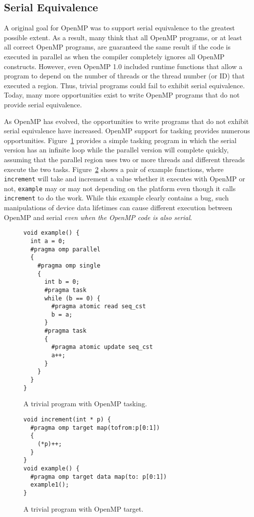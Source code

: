 \subsection{Serial Equivalence}
\label{sub:serial_equivalence}

A original goal for OpenMP was to support serial equivalence to the 
greatest possible extent. As a result, many think that all OpenMP programs, 
or at least all correct OpenMP programs, are guaranteed the same result
if the code is executed in parallel as when the compiler completely 
ignores all OpenMP constructs. However, even OpenMP 1.0 included runtime
functions that allow a program to depend on the number of threads or the
thread number (or ID) that executed a region. Thus, trivial programs could
fail to exhibit serial equivalence. Today, many more opportunities exist
to write OpenMP programs that do not provide serial equivalence. 

As OpenMP has evolved, the opportunities to write programs that do not
exhibit serial equivalence have increased. OpenMP support for tasking 
provides numerous opportunities. Figure~\ref{fig:trivial_task} provides
a simple tasking program in which the serial version has an infinite loop
while the parallel version will complete quickly, assuming that the parallel
region uses two or more threads and different threads execute the two tasks.
Figure~\ref{fig:trivial_target} shows a pair of example functions, where
\texttt{increment} will take and increment a value whether it executes with
OpenMP or not, \texttt{example} may or may not depending on the platform even
though it calls \texttt{increment} to do the work.  While this example clearly
contains a bug, such manipulations of device data lifetimes can cause different
execution between OpenMP and serial \emph{even when the OpenMP code is also
serial}.

\begin{figure}
\begin{verbatim}
void example() {
  int a = 0;
  #pragma omp parallel
  {
    #pragma omp single
    {
      int b = 0;
      #pragma task
      while (b == 0) {
        #pragma atomic read seq_cst
        b = a;
      }
      #pragma task
      {
        #pragma atomic update seq_cst
        a++;
      }
    }
  }
}
\end{verbatim}
\caption{A trivial program with OpenMP tasking.\label{fig:trivial_task}}
\end{figure}

\begin{figure}
\begin{verbatim}
void increment(int * p) {
  #pragma omp target map(tofrom:p[0:1])
  {
    (*p)++;
  }
}
void example() {
  #pragma omp target data map(to: p[0:1])
  example1();
}
\end{verbatim}
\caption{A trivial program with OpenMP target.\label{fig:trivial_target}}
\end{figure}

